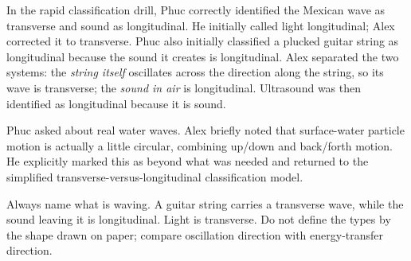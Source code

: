 \documentclass[11pt,a4paper]{article}
\newcommand{\trap}[1]{\begin{mistakebox}#1\end{mistakebox}}
\begin{document}
\begin{center}
\end{center}

In the rapid classification drill, Phuc correctly identified the Mexican wave as transverse and sound as longitudinal. He initially called light longitudinal; Alex corrected it to transverse. Phuc also initially classified a plucked guitar string as longitudinal because the sound it creates is longitudinal. Alex separated the two systems: the \emph{string itself} oscillates across the direction along the string, so its wave is transverse; the \emph{sound in air} is longitudinal. Ultrasound was then identified as longitudinal because it is sound.

Phuc asked about real water waves. Alex briefly noted that surface-water particle motion is actually a little circular, combining up/down and back/forth motion. He explicitly marked this as beyond what was needed and returned to the simplified transverse-versus-longitudinal classification model.

\trap{Always name what is waving. A guitar string carries a transverse wave, while the sound leaving it is longitudinal. Light is transverse. Do not define the types by the shape drawn on paper; compare oscillation direction with energy-transfer direction.}
\end{document}
